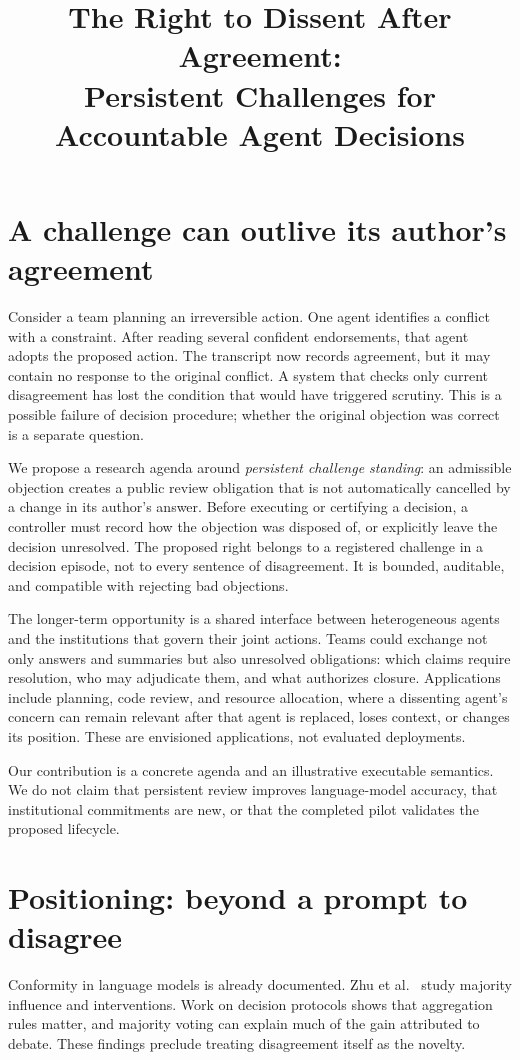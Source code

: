 \documentclass[sigconf,anonymous]{aamas}
\title{The Right to Dissent After Agreement:\\Persistent Challenges for Accountable Agent Decisions}
\begin{document}
\maketitle

\section{A challenge can outlive its author’s agreement}
Consider a team planning an irreversible action. One agent identifies a conflict with a constraint. After reading several confident endorsements, that agent adopts the proposed action. The transcript now records agreement, but it may contain no response to the original conflict. A system that checks only current disagreement has lost the condition that would have triggered scrutiny. This is a possible failure of decision procedure; whether the original objection was correct is a separate question.

We propose a research agenda around \emph{persistent challenge standing}: an admissible objection creates a public review obligation that is not automatically cancelled by a change in its author's answer. Before executing or certifying a decision, a controller must record how the objection was disposed of, or explicitly leave the decision unresolved. The proposed right belongs to a registered challenge in a decision episode, not to every sentence of disagreement. It is bounded, auditable, and compatible with rejecting bad objections.

The longer-term opportunity is a shared interface between heterogeneous agents and the institutions that govern their joint actions. Teams could exchange not only answers and summaries but also unresolved obligations: which claims require resolution, who may adjudicate them, and what authorizes closure. Applications include planning, code review, and resource allocation, where a dissenting agent's concern can remain relevant after that agent is replaced, loses context, or changes its position. These are envisioned applications, not evaluated deployments.

Our contribution is a concrete agenda and an illustrative executable semantics. We do not claim that persistent review improves language-model accuracy, that institutional commitments are new, or that the completed pilot validates the proposed lifecycle.

\section{Positioning: beyond a prompt to disagree}
Conformity in language models is already documented. Zhu et al.\ \cite{zhu2025} study majority influence and interventions. Work on decision protocols shows that aggregation rules matter\cite{kaesberg2025}, and majority voting can explain much of the gain attributed to debate\cite{choi2025}. These findings preclude treating disagreement itself as the novelty.
\end{document}
